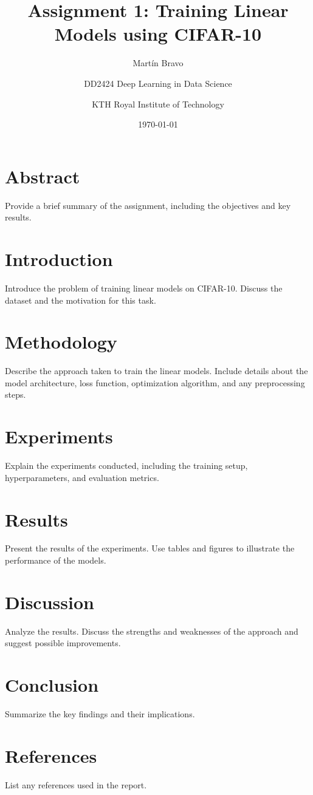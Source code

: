 \documentclass[a4paper,12pt]{article}
\title{Assignment 1: Training Linear Models using CIFAR-10}
\author{Martín Bravo \and DD2424 Deep Learning in Data Science \and KTH Royal Institute of Technology}
\date{\today}
\begin{document}
\maketitle

\section*{Abstract}
Provide a brief summary of the assignment, including the objectives and key results.

\section{Introduction}
Introduce the problem of training linear models on CIFAR-10. Discuss the dataset and the motivation for this task.

\section{Methodology}
Describe the approach taken to train the linear models. Include details about the model architecture, loss function, optimization algorithm, and any preprocessing steps.

\section{Experiments}
Explain the experiments conducted, including the training setup, hyperparameters, and evaluation metrics.

\section{Results}
Present the results of the experiments. Use tables and figures to illustrate the performance of the models.

\section{Discussion}
Analyze the results. Discuss the strengths and weaknesses of the approach and suggest possible improvements.

\section{Conclusion}
Summarize the key findings and their implications.

\section*{References}
List any references used in the report.
\end{document}
